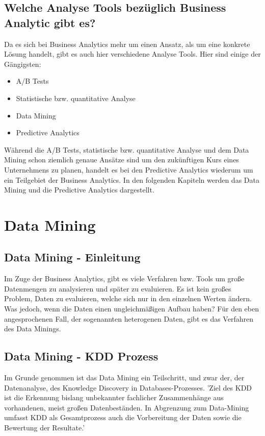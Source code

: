\documentclass[12pt,twocolumn,twoside]{conference}   %
\begin{document}
\subsection{Welche Analyse Tools bezüglich Business Analytic gibt es?}
Da es sich bei Business Analytics mehr um einen Ansatz, als um eine konkrete Lösung handelt, gibt es auch hier verschiedene Analyse Tools. Hier sind einige der Gängigsten:

\begin{itemize}
\item A/B Tests
\item Statistische bzw. quantitative Analyse
\item Data Mining
\item Predictive Analytics
\end{itemize}

Während die A/B Tests, statistische bzw. quantitative Analyse und dem Data Mining schon ziemlich genaue Ansätze sind um den zukünftigen Kurs eines Unternehmens zu planen, handelt es bei den Predictive Analytics wiederum um ein Teilgebiet der Business Analytics. In den folgenden Kapiteln werden das Data Mining und die Predictive Analytics dargestellt.

\section{Data Mining}
\subsection{Data Mining - Einleitung}
Im Zuge der Business Analytics, gibt es viele Verfahren bzw. Tools um große Datenmengen zu analysieren und später zu evaluieren. Es ist kein großes Problem, Daten zu evaluieren, welche sich nur in den einzelnen Werten ändern. Was jedoch, wenn die Daten einen ungleichmäßigen Aufbau haben? Für den eben angesprochenen Fall, der sogenannten heterogenen Daten, gibt es das Verfahren des Data Minings. 

\subsection{Data Mining - KDD Prozess}
Im Grunde genommen ist das Data Mining ein Teilschritt, und zwar der, der Datenanalyse, des Knowledge Discovery in Databases-Prozesses. 'Ziel des KDD ist die Erkennung bislang unbekannter fachlicher Zusammenhänge aus vorhandenen, meist großen Datenbeständen. In Abgrenzung zum Data-Mining umfasst KDD als Gesamtprozess auch die Vorbereitung der Daten sowie die Bewertung der Resultate.' \cite{Beispiel2:2016}
\end{document}
